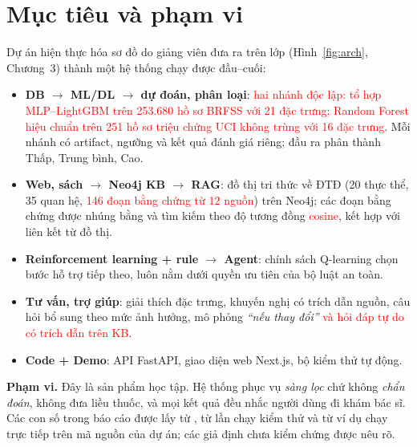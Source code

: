 \documentclass[12pt,a4paper]{report}
\newcommand{\code}[1]{{\small\path{#1}}}
\newcommand{\capnhat}[1]{\textcolor{red}{#1}}
\begin{document}
\section{Mục tiêu và phạm vi}
Dự án hiện thực hóa sơ đồ do giảng viên đưa ra trên lớp (Hình~\ref{fig:arch}, Chương~3) thành một hệ thống chạy được đầu--cuối:
\begin{itemize}[nosep]
\item \textbf{DB $\rightarrow$ ML/DL $\rightarrow$ dự đoán, phân loại}: \capnhat{hai nhánh độc lập: tổ hợp MLP--LightGBM trên 253.680 hồ sơ BRFSS với 21 đặc trưng; Random Forest hiệu chuẩn trên 251 hồ sơ triệu chứng UCI không trùng với 16 đặc trưng}. Mỗi nhánh có artifact, ngưỡng và kết quả đánh giá riêng; đầu ra phân thành Thấp, Trung bình, Cao.
\item \textbf{Web, sách $\rightarrow$ Neo4j KB $\rightarrow$ RAG}: đồ thị tri thức về ĐTĐ (20 thực thể, 35 quan hệ, \capnhat{146 đoạn bằng chứng từ 12 nguồn}) trên Neo4j; các đoạn bằng chứng được nhúng bằng \capnhat{\code{BAAI/bge-m3}} và tìm kiếm theo độ tương đồng \capnhat{cosine}, kết hợp với liên kết từ đồ thị.
\item \textbf{Reinforcement learning + rule $\rightarrow$ Agent}: chính sách Q-learning chọn bước hỗ trợ tiếp theo, luôn nằm dưới quyền ưu tiên của bộ luật an toàn.
\item \textbf{Tư vấn, trợ giúp}: giải thích đặc trưng, khuyến nghị có trích dẫn nguồn, câu hỏi bổ sung theo mức ảnh hưởng, mô phỏng \emph{``nếu thay đổi''} \capnhat{và hỏi đáp tự do có trích dẫn trên KB}.
\item \textbf{Code + Demo}: API FastAPI, giao diện web Next.js, bộ kiểm thử tự động.
\end{itemize}
\textbf{Phạm vi.} Đây là sản phẩm học tập. Hệ thống phục vụ \emph{sàng lọc} chứ không \emph{chẩn đoán}, không đưa liều thuốc, và mọi kết quả đều nhắc người dùng đi khám bác sĩ. Các con số trong báo cáo được lấy từ \code{artifacts/}, từ lần chạy kiểm thử và từ ví dụ chạy trực tiếp trên mã nguồn của dự án; các giả định chưa kiểm chứng được nêu rõ.
\end{document}
